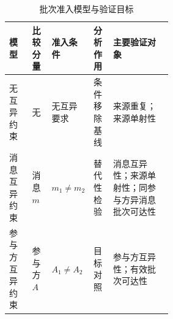 \begin{table}[htbp]
  \centering
  \caption{批次准入模型与验证目标}
  \label{tab:admission-configurations}
  \footnotesize
  \begin{tabularx}{\linewidth}{@{}L{0.14\linewidth}C{0.12\linewidth}C{0.15\linewidth}L{0.12\linewidth}Y@{}}
    \toprule
    模型 & 比较分量 & 准入条件 & 分析作用 & 主要验证对象 \\
    \midrule
    无互异约束 & 无 & 无互异要求 & 条件移除基线 & 来源重复；来源单射性 \\
    消息互异约束 & 消息$m$ & $m_1\neq m_2$ & 替代性检验 & 消息互异性；来源单射性；同参与方异消息批次可达性 \\
    参与方互异约束 & 参与方$A$ & $A_1\neq A_2$ & 目标对照 & 参与方互异性；有效批次可达性 \\
    \bottomrule
  \end{tabularx}
\end{table}

